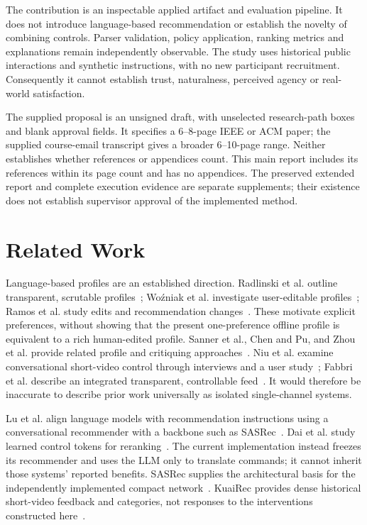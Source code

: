 \documentclass[conference]{IEEEtran}
\begin{document}
The contribution is an inspectable applied artifact and evaluation pipeline. It does not introduce language-based recommendation or establish the novelty of combining controls. Parser validation, policy application, ranking metrics and explanations remain independently observable. The study uses historical public interactions and synthetic instructions, with no new participant recruitment. Consequently it cannot establish trust, naturalness, perceived agency or real-world satisfaction.

The supplied proposal is an unsigned draft, with unselected research-path boxes and blank approval fields. It specifies a 6--8-page IEEE or ACM paper; the supplied course-email transcript gives a broader 6--10-page range. Neither establishes whether references or appendices count. This main report includes its references within its page count and has no appendices. The preserved extended report and complete execution evidence are separate supplements; their existence does not establish supervisor approval of the implemented method.

\section{Related Work}
Language-based profiles are an established direction. Radlinski et al. outline transparent, scrutable profiles~\cite{radlinski2022profiles}; Wo\'{z}niak et al. investigate user-editable profiles~\cite{wozniak2025profiles}; Ramos et al. study edits and recommendation changes~\cite{ramos2024transparent}. These motivate explicit preferences, without showing that the present one-preference offline profile is equivalent to a rich human-edited profile. Sanner et al., Chen and Pu, and Zhou et al. provide related profile and critiquing approaches~\cite{sanner2023competitive,chen2012critiquing,zhou2024language}. Niu et al. examine conversational short-video control through interviews and a user study~\cite{niu2025chat}; Fabbri et al. describe an integrated transparent, controllable feed~\cite{fabbri2026feeding}. It would therefore be inaccurate to describe prior work universally as isolated single-channel systems.

Lu et al. align language models with recommendation instructions using a conversational recommender with a backbone such as SASRec~\cite{lu2024aligning}. Dai et al. study learned control tokens for reranking~\cite{dai2025token}. The current implementation instead freezes its recommender and uses the LLM only to translate commands; it cannot inherit those systems' reported benefits. SASRec supplies the architectural basis for the independently implemented compact network~\cite{kang2018sasrec}. KuaiRec provides dense historical short-video feedback and categories, not responses to the interventions constructed here~\cite{gao2022kuairec}.
\end{document}
